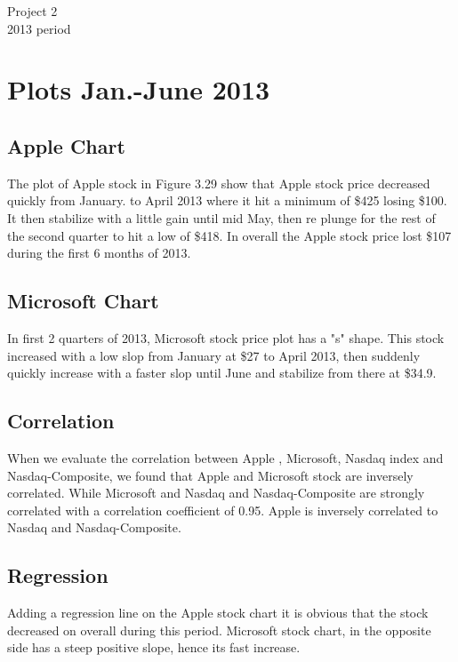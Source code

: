 \documentclass{article}[14pt]
\begin{document}
\bigskip

\begin{center}
  \begin{Large}
    Project 2\\
    2013 period
  \end{Large}
\end{center} 

\section{Plots Jan.-June 2013}

\subsection{Apple Chart}

The plot of Apple stock in Figure 3.29 show that Apple stock price decreased quickly from January. to April 2013 where it hit a minimum of \$425 losing \$100. It then stabilize with a little gain until mid May, then re plunge for the rest of the second quarter to hit a low of \$418.
In overall the Apple stock price lost \$107 during the first 6 months of 2013.


\subsection{Microsoft Chart}

In first 2 quarters of 2013, Microsoft stock price plot has a "s" shape. This stock increased with a low slop from January at \$27 to April 2013, then suddenly quickly increase with a faster slop until June and stabilize from there at \$34.9. 
\subsection{Correlation}
When we evaluate the correlation between Apple , Microsoft, Nasdaq index and Nasdaq-Composite, we found that Apple and Microsoft stock are inversely correlated. While Microsoft and Nasdaq and Nasdaq-Composite are strongly correlated with a correlation coefficient of 0.95. Apple is inversely correlated to Nasdaq and Nasdaq-Composite.
\subsection{Regression}
Adding a regression line on the Apple stock chart it is obvious that the stock decreased on overall during this period. Microsoft stock chart, in the opposite side has a steep positive slope, hence its fast increase.
\end{document}
